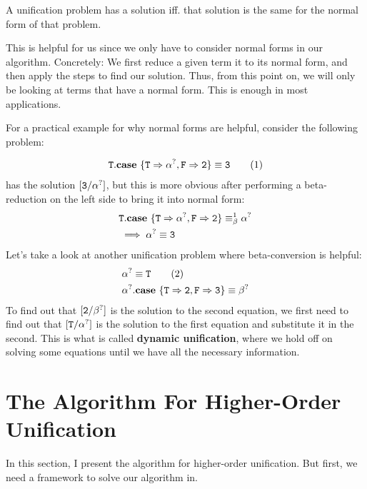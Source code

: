 \documentclass[twoside,12pt,a4paper]{article}
\begin{document}
\begin{theorem}
    A unification problem has a solution iff. that solution is the same for the normal form of that problem. 
\end{theorem}

This is helpful for us since we only have to consider normal forms in our algorithm.
Concretely: We first reduce a given term it to its normal form, and then apply the steps to find our solution.
Thus, from this point on, we will only be looking at terms that have a normal form. This is enough in most applications. %

For a practical example for why normal forms are helpful, consider the following problem:
\begin{example}
    \begin{align*}
        \mathtt{T}.\textbf{case}\ \{\mathtt{T} \Rightarrow \alpha^?, \mathtt{F} \Rightarrow \mathtt{2}\} \equiv \mathtt{3} \tag{1}
    \end{align*}
    has the solution $[\mathtt{3/\alpha^?}]$, but this is more obvious after performing a beta-reduction on the left side 
    to bring it into normal form:
    \begin{align*}
        &\mathtt{T}.\textbf{case}\ \{\mathtt{T} \Rightarrow \alpha^?, \mathtt{F} \Rightarrow \mathtt{2}\} \equiv_{\beta}^1 \alpha^?\\
        &\implies \alpha^? \equiv \mathtt{3}   
    \end{align*}       
Let's take a look at another unification problem where beta-conversion is helpful:
\begin{align*}
    &\alpha^? \equiv \mathtt{T} \tag{2}\\
    &\alpha^?.\textbf{case}\ \{\mathtt{T\Rightarrow 2, F\Rightarrow 3}\} \equiv \beta^?
\end{align*}
To find out that $[\mathtt{2}/\beta^?]$ is the solution to the second equation, we first need to find out that
$[\mathtt{T}/\alpha^?]$ is the solution to the first equation and substitute it in the second.
This is what is called \textbf{dynamic unification}, where we hold off on solving some equations 
until we have all the necessary information. 
 
\end{example}

\section{The Algorithm For Higher-Order Unification}\label{The Algorithm For Higher-Order Unification}
In this section, I present the algorithm for higher-order unification.
But first, we need a framework to solve our algorithm in.
\end{document}
